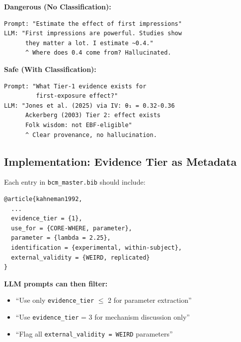 \documentclass[11pt, a4paper]{article}
\begin{document}
\begin{tcolorbox}[colback=yellow!5!white, colframe=yellow!75!black,
    title=LLM Parameter Extraction: Dangerous vs. Safe]

\textbf{Dangerous (No Classification):}
\begin{verbatim}
Prompt: "Estimate the effect of first impressions"
LLM: "First impressions are powerful. Studies show
      they matter a lot. I estimate ~0.4."
      ^ Where does 0.4 come from? Hallucinated.
\end{verbatim}

\textbf{Safe (With Classification):}
\begin{verbatim}
Prompt: "What Tier-1 evidence exists for
         first-exposure effect?"
LLM: "Jones et al. (2025) via IV: θ₁ = 0.32-0.36
      Ackerberg (2003) Tier 2: effect exists
      Folk wisdom: not EBF-eligible"
      ^ Clear provenance, no hallucination.
\end{verbatim}

\end{tcolorbox}

\subsection{Implementation: Evidence Tier as Metadata}

\begin{tcolorbox}[colback=blue!5!white, colframe=blue!75!black,
    title=Proposed Bibliography Tagging Schema]

Each entry in \texttt{bcm\_master.bib} should include:

\begin{verbatim}
@article{kahneman1992,
  ...
  evidence_tier = {1},
  use_for = {CORE-WHERE, parameter},
  parameter = {lambda = 2.25},
  identification = {experimental, within-subject},
  external_validity = {WEIRD, replicated}
}
\end{verbatim}

\textbf{LLM prompts can then filter:}
\begin{itemize}[nosep]
    \item ``Use only \texttt{evidence\_tier} $\leq$ 2 for parameter extraction''
    \item ``Use \texttt{evidence\_tier} = 3 for mechanism discussion only''
    \item ``Flag all \texttt{external\_validity = WEIRD} parameters''
\end{itemize}

\end{tcolorbox}
\end{document}
